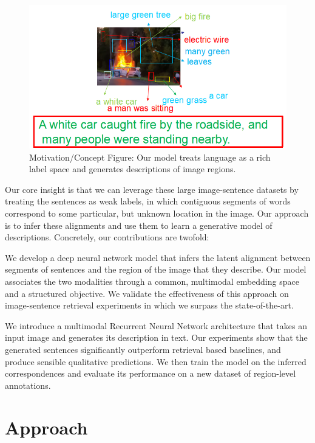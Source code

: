 \documentclass[12pt]{article}%
\begin{document}
\begin{figure}[t]
\begin{center}
   \includegraphics[width=0.8\linewidth]{p111.jpg}
\end{center}
   \caption{Motivation/Concept Figure: Our model treats language as a rich label space and generates descriptions of image regions.}
\label{fig:circle}
\end{figure}

Our core insight is that we can leverage these large image-sentence datasets by treating the sentences as weak labels, in which contiguous segments of words correspond to some particular, but unknown location in the image. Our approach is to infer these alignments and use them to learn  a generative model of descriptions. Concretely, our contributions are twofold:

We develop a deep neural network model  that  infers the latent alignment between segments of sentences and the region of the image that they describe. Our model associates the two modalities through a common, multimodal embedding space and a structured objective. We validate the effectiveness of this approach on image-sentence retrieval experiments in which we surpass the state-of-the-art.

We introduce a multimodal Recurrent Neural Network architecture that takes an input image and generates its description in text. Our experiments show that the generated sentences significantly outperform retrieval based baselines, and produce sensible qualitative predictions. We then train the model on the inferred correspondences and evaluate its performance on a new dataset of region-level annotations.



\section{Approach}
\end{document}
